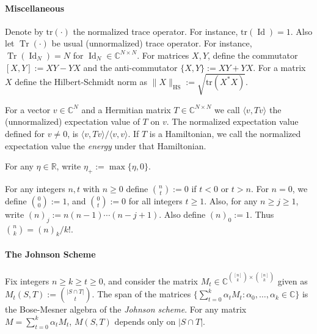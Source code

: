 \documentclass
[11pt,letterpaper]
{article}
\theoremstyle{definition}
\newcommand{\Tr}{\operatorname{Tr}}
\newcommand{\R}{{\mathbb R}}
\newcommand{\1}{\mathbf{1}}
\newcommand{\tr}{\mathrm{tr}}
\newcommand{\C}{\mathbb C}
\newcommand{\Id}{\operatorname{Id}}
\renewcommand{\geq}{\geqslant}
\begin{document}
\paragraph{Miscellaneous} Denote by $\tr(\cdot)$ the normalized trace operator. For instance, $\tr(\Id) = 1$. Also let $\Tr(\cdot)$ be usual (unnormalized) trace operator. For instance, $\Tr(\Id_N) = N$ for $\Id_N\in\C^{N\times N}$. For matrices $X, Y$, define the commutator $[X, Y]:= XY - YX$ and the anti-commutator $\{X, Y\}:= XY + YX$. For a matrix $X$ define the Hilbert-Schmidt norm as $\|X\|_{\operatorname{HS}}:= \sqrt{\tr(X^*X)}$. 

For a vector $v\in \C^N$ and a Hermitian matrix $T\in \C^{N\times N}$ we call $\langle v, Tv\rangle $ the (unnormalized) expectation value of $T$ on $v$. The normalized expectation value defined for $v\neq 0$, is $\langle v, Tv\rangle/\langle v,v\rangle$. If $T$ is a Hamiltonian, we call the normalized expectation value the \emph{energy} under that Hamiltonian.

For any $\eta\in\R$, write $\eta_+:= \max\{\eta, 0\}$. 

For any integers $n, t$ with $n\geq 0$ define $\binom{n}{t}:= 0$ if $t < 0$ or $t > n$. For $n = 0$, we define $\binom{0}{0}:= 1$, and $\binom{0}{t}:= 0$ for all integers $t\geq 1$. Also, for any $n\geq j\geq 1$, write $(n)_j:= n(n - 1)\cdots (n - j + 1)$. Also define $(n)_0:= 1$. Thus $\binom{n}{k} = (n)_k/k!$. 

\paragraph{The Johnson Scheme} Fix integers $n\geq k\geq t\geq 0$, and consider the matrix $M_t\in\C^{\binom{[n]}{k}\times\binom{[n]}{k}}$ given as $M_t(S, T):= \binom{|S\cap T|}{t}$. The span of the matrices $\{\sum_{t = 0}^k\alpha_tM_t:\alpha_0, \ldots, \alpha_k\in\C\}$ is the Bose-Mesner algebra of the \emph{Johnson scheme}. For any matrix $M = \sum_{t = 0}^k\alpha_tM_t$, $M(S, T)$ depends only on $|S\cap T|$. 
\end{document}

